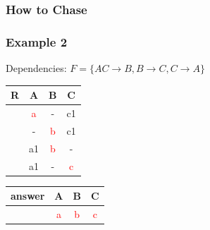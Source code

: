 \documentclass{beamer}
\begin{document}
\begin{frame}
  \frametitle{How to Chase}
  \begin{figure}[!htp]
\centering
{}
\end{figure}
\end{frame}

\begin{frame}
  \frametitle{Example 2}
  Dependencies: $F = \{AC \rightarrow B, B \rightarrow C, C \rightarrow A \}$\\
  \begin{tabular}{ c | c c c}
  R & A & B & C \\
  \hline
  & \textcolor{red}{a}  & -  & c1 \\
  & -  & \textcolor{red}{b}  & c1 \\
  & a1 & \textcolor{red}{b} & - \\
  & a1 & - & \textcolor{red}{c} \\
  \end{tabular}
  \begin{tabular}{ c | c c c}
  answer & A & B & C \\
  \hline
   & \textcolor{red}{a}& \textcolor{red}{b}& \textcolor{red}{c}\\
  \end{tabular}
\end{frame}
\end{document}
